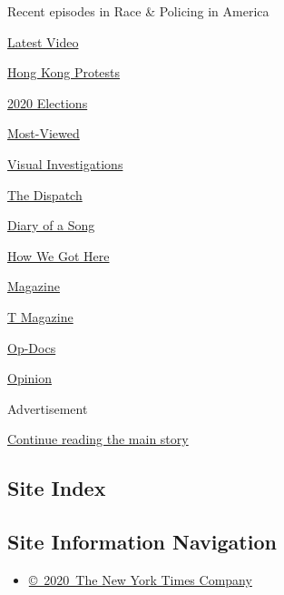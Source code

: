 Recent episodes in Race \& Policing in America

\href{/video}{}

\href{/video/latest-video}{Latest Video}

\href{/video/hk-protest}{Hong Kong Protests}

\href{/video/2020-Elections}{2020 Elections}

\href{/video/Most-Viewed}{Most-Viewed}

\href{/video/investigations}{Visual Investigations}

\href{/video/on-the-ground}{The Dispatch}

\href{/video/diaryofasong}{Diary of a Song}

\href{/video/how-we-got-here}{How We Got Here}

\href{/video/magazine}{Magazine}

\href{/video/t-magazine}{T Magazine}

\href{/video/op-docs}{Op-Docs}

\href{/video/opinion}{Opinion}

Advertisement

\protect\hyperlink{after-bottom}{Continue reading the main story}

\hypertarget{site-index}{%
\subsection{Site Index}\label{site-index}}

\hypertarget{site-information-navigation}{%
\subsection{Site Information
Navigation}\label{site-information-navigation}}

\begin{itemize}
\tightlist
\item
  \href{https://help.nytimes3xbfgragh.onion/hc/en-us/articles/115014792127-Copyright-notice}{©~2020~The
  New York Times Company}
\end{itemize}

